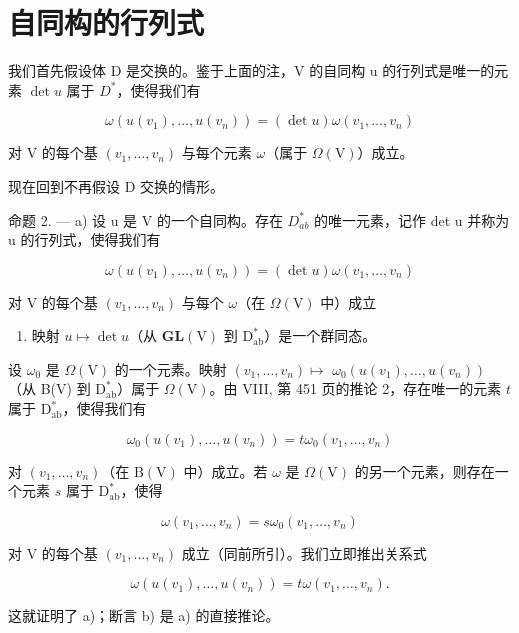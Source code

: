 \section{自同构的行列式}

我们首先假设体 D 是交换的。鉴于上面的注，V 的自同构 u 的行列式是唯一的元素 \(\det u\) 属于 \(D^{*}\)，使得我们有

\[
\omega (u (v _ {1}), \ldots , u (v _ {n})) = (\det u) \omega (v _ {1}, \ldots , v _ {n})\tag{14}
\]

对 V 的每个基 \((v_{1},\ldots ,v_{n})\) 与每个元素 \(\omega\)（属于 \(\Omega (\mathrm{V})\)）成立。

现在回到不再假设 D 交换的情形。

命题 2. --- a) 设 u 是 V 的一个自同构。存在 \(D_{ab}^{*}\) 的唯一元素，记作 det u 并称为 u 的行列式，使得我们有

\[
\omega (u (v _ {1}), \ldots , u (v _ {n})) = (\det u) \omega (v _ {1}, \ldots , v _ {n})\tag{15}
\]

对 V 的每个基 \((v_{1},\ldots ,v_{n})\) 与每个 \(\omega\)（在 \(\Omega (\mathrm{V})\) 中）成立

\begin{enumerate}
\def\labelenumi{\alph{enumi})}
\setcounter{enumi}{1}
\tightlist
\item
  映射 \(u \mapsto \det u\)（从 \(\mathbf{GL}(\mathrm{V})\) 到 \(\mathrm{D}_{\mathrm{ab}}^{*}\)）是一个群同态。
\end{enumerate}

设 \(\omega_0\) 是 \(\Omega (\mathrm{V})\) 的一个元素。映射 \((v_{1},\ldots ,v_{n})\mapsto\) \(\omega_0(u(v_1),\dots ,u(v_n))\)（从 B(V) 到 \(\mathrm{D}_{\mathrm{ab}}^{*}\)）属于 \(\Omega (\mathrm{V})\)。由 VIII, 第 451 页的推论 2，存在唯一的元素 \(t\) 属于 \(\mathrm{D}_{\mathrm{ab}}^{*}\)，使得我们有

\[
\omega_ {0} (u (v _ {1}), \ldots , u (v _ {n})) = t \omega_ {0} (v _ {1}, \ldots , v _ {n})
\]

对 \((v_{1},\ldots ,v_{n})\)（在 \(\mathrm{B(V)}\) 中）成立。若 \(\omega\) 是 \(\Omega (\mathrm{V})\) 的另一个元素，则存在一个元素 \(s\) 属于 \(\mathrm{D}_{\mathrm{ab}}^{*}\)，使得

\[
\omega (v _ {1}, \ldots , v _ {n}) = s \omega_ {0} (v _ {1}, \ldots , v _ {n})
\]

对 V 的每个基 \((v_{1},\ldots ,v_{n})\) 成立（同前所引）。我们立即推出关系式

\[
\omega (u (v _ {1}), \dots , u (v _ {n})) = t \omega (v _ {1}, \dots , v _ {n}).
\]

这就证明了 a)；断言 b) 是 a) 的直接推论。

